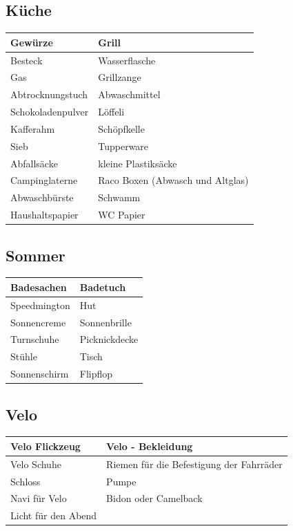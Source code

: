 \subsection{Küche}
\begin{center}
\begin{tabular}{|p{5cm}|p{5cm}|}\hline
Gewürze & Grill \\ \hline
Besteck & Wasserflasche \\ \hline
Gas & Grillzange  \\ \hline
Abtrocknungstuch & Abwaschmittel \\ \hline
Schokoladenpulver & Löffeli \\ \hline
Kafferahm & Schöpfkelle \\ \hline
Sieb & Tupperware \\ \hline
Abfallsäcke & kleine Plastiksäcke \\ \hline
Campinglaterne & Raco Boxen (Abwasch und Altglas) \\ \hline
Abwaschbürste & Schwamm \\ \hline
Haushaltspapier & WC Papier \\ \hline
\end{tabular}
\end{center}
\newpage

\subsection{Sommer}
\begin{center}
\begin{tabular}{|p{5cm}|p{5cm}|}\hline
Badesachen & Badetuch \\ \hline
Speedmington & Hut \\ \hline
Sonnencreme & Sonnenbrille \\ \hline
Turnschuhe & Picknickdecke \\ \hline
Stühle & Tisch \\ \hline
Sonnenschirm & Flipflop \\ \hline
\end{tabular}
\end{center}
\newpage

\subsection{Velo}
\begin{center}
\begin{tabular}{|p{5cm}|p{5cm}|}\hline
Velo Flickzeug & Velo - Bekleidung \\ \hline
Velo Schuhe & Riemen für die Befestigung der Fahrräder \\ \hline
Schloss & Pumpe \\ \hline
Navi für Velo & Bidon oder Camelback \\ \hline
Licht für den Abend & \\ \hline
\end{tabular}
\end{center}
\newpage


